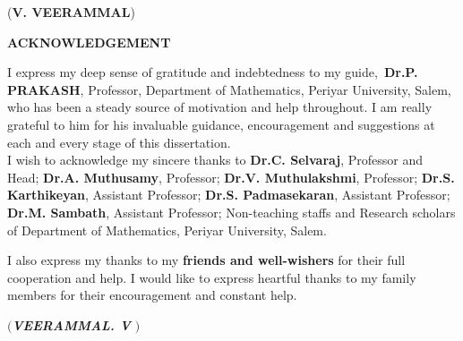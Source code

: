 \documentclass[a4paper,12pt]{report}
\begin{document}
	\vskip  0.1cm
	\hfill (\textbf{V. VEERAMMAL}) \hspace{0.cm}
	
	
	
	\newpage\thispagestyle{empty}
	\begin{center}
		\textbf{ACKNOWLEDGEMENT}
	\end{center}
	\begin{sloppypar}
	 I  express  my   deep   sense   of   gratitude  and indebtedness \linebreak to
	my guide,\  \textbf{Dr.P. PRAKASH}, Professor, Department of \linebreak Mathematics,
	Periyar University, Salem, who has been a steady
	source of motivation and help throughout.  I am really grateful to
	him for his invaluable guidance, encouragement and
	suggestions at each and every stage of this dissertation.\\
	
	I wish to acknowledge my sincere thanks to \textbf{Dr.C. Selvaraj}, \linebreak Professor and Head; \textbf{Dr.A. Muthusamy}, Professor; \linebreak \textbf{Dr.V. Muthulakshmi}, Professor;  \textbf{Dr.S. Karthikeyan},  Assistant \linebreak Professor; \textbf{Dr.S. Padmasekaran}, Assistant Professor; \linebreak \textbf{Dr.M. Sambath}, Assistant Professor; Non-teaching staffs and Research scholars of Department of Mathematics, Periyar University, Salem.\\
	\end{sloppypar}
	\begin{sloppypar}
	I also express my thanks to my \textbf{friends and well-wishers} for their full cooperation and help. I would like to express heartful thanks to my family members for their encouragement and constant help.\\ 
	\end{sloppypar}
	
	
	\hfill \textit{$($\textbf{VEERAMMAL. V }$)$}
	\fontsize{15pt}{22pt}\selectfont
	\linespread{1.5}
	\clearpage
	\newtheorem{Rem}{Remark}[section]
	\newtheorem{thm}{Theorem}[section]
	\newtheorem{cor}{Corollary}[section]
	\newtheorem{Lem}{Lemma}[section]
	\newtheorem{Pro}{Proposition}[section]
	\newtheorem{Ass}{Assumption}[section]
	\newtheorem{Con}{Conclusion}[section]
	\newtheorem{defn}{Definition}[section]
	\newtheorem{ex}{Example}[section]
	
\end{document}
